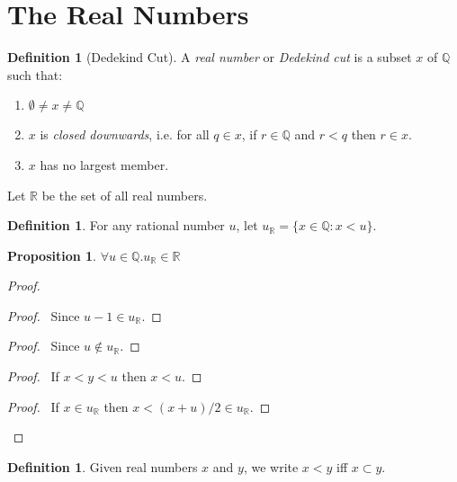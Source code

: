 \documentclass{article}
\let\qed\relax
\newtheorem{proposition}[axiom]{Proposition}
\theoremstyle{definition}
\newtheorem{definition}[axiom]{Definition}
\begin{document}
    \section{The Real Numbers}

    \begin{definition}[Dedekind Cut]
        A \emph{real number} or \emph{Dedekind cut} is a subset $x$ of $\mathbb{Q}$ such that:
        \begin{enumerate}
            \item $\emptyset \neq x \neq \mathbb{Q}$
            \item $x$ is \emph{closed downwards}, i.e. for all $q \in x$, if $r \in \mathbb{Q}$
            and $r < q$ then $r \in x$.
            \item $x$ has no largest member.
        \end{enumerate}
        Let $\mathbb{R}$ be the set of all real numbers.
    \end{definition}

    \begin{definition}
        For any rational number $u$, let $u_\mathbb{R} = \{ x \in \mathbb{Q} : x < u \}$.
    \end{definition}

    \begin{proposition}
        $\forall u \in \mathbb{Q}. u_\mathbb{R} \in \mathbb{R}$
    \end{proposition}

    \begin{proof}
        \pf
        \begin{proof}
            \pf\ Since $u-1 \in u_\mathbb{R}$.
        \end{proof}
        \begin{proof}
            \pf\ Since $u \notin u_\mathbb{R}$.
        \end{proof}
        \begin{proof}
            \pf\ If $x < y < u$ then $x < u$.
        \end{proof}
        \begin{proof}
            \pf\ If $x \in u_\mathbb{R}$ then $x < (x+u)/2 \in u_\mathbb{R}$.
        \end{proof}
        \qed
    \end{proof}
    \begin{definition}
        Given real numbers $x$ and $y$, we write $x < y$ iff $x \subset y$.
    \end{definition}
\end{document}
